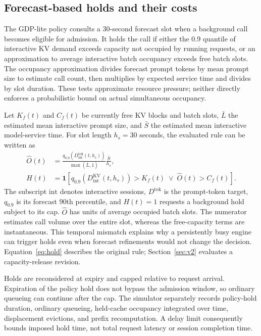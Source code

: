 \documentclass[11pt,a4paper]{article}
\begin{document}
\subsection{Forecast-based holds and their costs}
\label{sec:4.3}
The GDP-lite policy consults a 30-second forecast slot when a background call becomes eligible for admission. It holds the call if either the 0.9 quantile of interactive KV demand exceeds capacity not occupied by running requests, or an approximation to average interactive batch occupancy exceeds free batch slots. The occupancy approximation divides forecast prompt tokens by mean prompt size to estimate call count, then multiplies by expected service time and divides by slot duration. These tests approximate resource pressure; neither directly enforces a probabilistic bound on actual simultaneous occupancy.

Let \(K_f(t)\) and \(C_f(t)\) be currently free KV blocks and batch slots, \(\bar L\) the estimated mean interactive prompt size, and \(\bar S\) the estimated mean interactive model-service time. For slot length \(h_s=30\) seconds, the evaluated rule can be written as
\begin{align}
\widehat O(t)&=\frac{q_{0.9}(D^{\mathrm{tok}}_{\mathrm{int}}(t,h_s))}{\max(\bar L,1)}\frac{\bar S}{h_s},\\
H(t)&=\mathbf{1}\!\left[q_{0.9}(D^{\mathrm{KV}}_{\mathrm{int}}(t,h_s))>K_f(t)
\;\lor\;\widehat O(t)>C_f(t)\right].
\label{eq:hold}
\end{align}
The subscript \(\mathrm{int}\) denotes interactive sessions, \(D^{\mathrm{tok}}\) is the prompt-token target, \(q_{0.9}\) is its forecast 90th percentile, and \(H(t)=1\) requests a background hold subject to its cap. \(\widehat O\) has units of average occupied batch slots. The numerator estimates call volume over the entire slot, whereas the free-capacity terms are instantaneous. This temporal mismatch explains why a persistently busy engine can trigger holds even when forecast refinements would not change the decision. Equation~\eqref{eq:hold} describes the original rule; Section~\ref{sec:v2} evaluates a capacity-release revision.


Holds are reconsidered at expiry and capped relative to request arrival. Expiration of the policy hold does not bypass the admission window, so ordinary queueing can continue after the cap. The simulator separately records policy-hold duration, ordinary queueing, held-cache occupancy integrated over time, displacement evictions, and prefix recomputation. A delay limit consequently bounds imposed hold time, not total request latency or session completion time.
\end{document}
